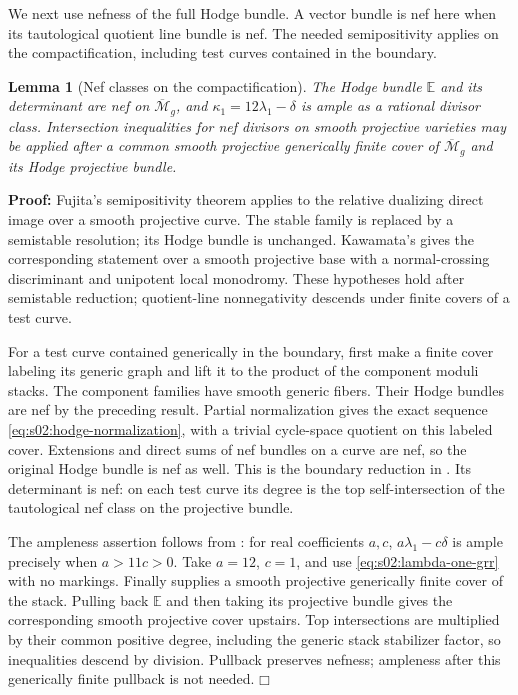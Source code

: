 \documentclass[a4paper,10pt]{article}
\numberwithin{equation}{section}
\newcommand{\MM}{\overline{\mathcal{M}}}
\newcommand{\EE}{\mathbb{E}}
\theoremstyle{paperplain}
\newtheorem{lmm}[thm]{Lemma}
\theoremstyle{paperremark}
\theoremstyle{paperplain}
\newenvironment{prf}{\noindent \textbf{Proof: }}{\hfill $\mdlgwhtsquare$\par\addvspace{0.5\baselineskip}}
\begin{document}
We next use nefness of the full Hodge bundle. A vector bundle is
nef here when its tautological quotient line bundle is nef.
The needed semipositivity applies on the compactification, including
test curves contained in the boundary.

\begin{lmm}[Nef classes on the compactification]\label{lmm:s08:nef}
The Hodge bundle $\EE$ and its determinant are nef on $\MM_g$,
and $\kappa_1=12\lambda_1-\delta$ is ample as a rational divisor
class. Intersection inequalities for nef divisors on smooth
projective varieties may be applied after a common smooth
projective generically finite cover of $\MM_g$ and its Hodge
projective bundle.
\end{lmm}
\begin{prf}
Fujita's semipositivity theorem \cite[Main Theorem (0.6)]{Fuj78}
applies to the relative dualizing direct image over a smooth
projective curve. The stable family is replaced by a semistable
resolution; its Hodge bundle is unchanged. Kawamata's
\cite[Theorem 5]{Kaw81} gives the corresponding statement over a
smooth projective base with a normal-crossing discriminant and
unipotent local monodromy. These hypotheses hold after semistable
reduction; quotient-line nonnegativity descends under finite
covers of a test curve.

For a test curve contained generically in the boundary, first make
a finite cover labeling its generic graph and lift it to the
product of the component moduli stacks. The component families
have smooth generic fibers. Their Hodge bundles are nef by the
preceding result. Partial normalization gives the exact sequence
\eqref{eq:s02:hodge-normalization}, with a trivial cycle-space
quotient on this labeled cover. Extensions and direct sums of nef
bundles on a curve are nef, so the original Hodge bundle is nef as
well. This is the boundary reduction in
\cite[Proposition 4.4]{LX26b}. Its determinant is nef: on each
test curve its degree is the top self-intersection of the
tautological nef class on the projective bundle.

The ampleness assertion follows from
\cite[Theorem (1.3)]{CH88}: for real coefficients $a,c$,
$a\lambda_1-c\delta$ is ample precisely when $a>11c>0$.
Take $a=12$, $c=1$, and use
\eqref{eq:s02:lambda-one-grr} with no markings.
Finally \cite[Proposition 6.1, $m=0$]{LX26b} supplies a smooth
projective generically finite cover of the stack. Pulling back
$\EE$ and then taking its projective bundle gives the corresponding
smooth projective cover upstairs. Top intersections are multiplied
by their common positive degree, including the generic stack
stabilizer factor, so inequalities descend by division. Pullback
preserves nefness; ampleness after this generically finite
pullback is not needed.
\end{prf}
\end{document}
